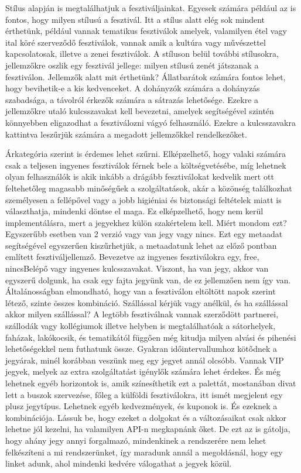 Stílus alapján is megtalálhatjuk a fesztiváljainkat. Egyesek számára például az is fontos, hogy milyen stílusú a fesztivál. Itt a stílus alatt elég sok mindent érthetünk, például vannak tematikus fesztiválok amelyek, valamilyen étel vagy ital köré szerveződő fesztiválok, vannak amik a kultúra vagy művészettel kapcsolatosak, illetve a zenei fesztiválok. A stíluson belül további stílusokra, jellemzőkre oszlik egy fesztivál jellege:  milyen stílusú zenét játszanak a fesztiválon. Jellemzők alatt mit érthetünk? Állatbarátok számára fontos lehet, hogy bevihetik-e  a kis kedvenceket. A dohányzók számára a dohányzás szabadsága, a távolról érkezők számára  a sátrazás lehetősége. Ezekre a jellemzőkre utaló kulcsszavakat kell bevezetni, amelyek segítségével szintén könnyebben eligazodhat a fesztiválozni vágyó felhasználó. Ezekre a kulcsszavakra kattintva leszűrjük számára a megadott jellemzőkkel rendelkezőket.

Árkategória szerint is érdemes lehet szűrni. Elképzelhető, hogy valaki számára csak a teljesen ingyenes fesztiválok férnek bele a költségvetésébe, míg lehetnek olyan felhasználók is akik inkább a drágább fesztiválokat kedvelik mert ott feltehetőleg magasabb minőségűek a szolgáltatások, akár a közönség találkozhat személyesen a fellépővel vagy a jobb higiéniai és biztonsági feltételek miatt is választhatja, mindenki döntse el maga. Ez elképzelhető, hogy nem kerül implementálásra, mert a jegyekhez külön szakértelem kell. Miért mondom ezt? Egyszerűbb esetben van 2 verzió vagy van jegy vagy nincs. Ezt egy metaadat segítségével egyszerűen kiszűrhetjük, a metaadatunk lehet az előző pontban említett fesztiváljellemző. Bevezetve az ingyenes fesztiválokra egy, free, nincsBelépő vagy ingyenes kulcsszavakat. Viszont, ha van jegy, akkor van egyszerű dolgunk, ha csak egy fajta jegyünk van, de ez jellemzően nem így van. Általánosságban elmondható, hogy van a fesztiválon eltöltött napok szerint létező, szinte összes kombináció. Szállással kérjük vagy anélkül, és ha szállással akkor milyen szállással? A legtöbb fesztiválnak vannak szerződött partnerei, szállodák vagy kollégiumok illetve helyben is megtalálhatóak a sátorhelyek, faházak, lakókocsik, és tematikától függően még kitudja milyen alvási és pihenési lehetőségekkel nem futhatunk össze. Gyakran időintervallumhoz kötődnek a jegyárak, minél korábban veszünk meg egy jegyet annál olcsóbb. Vannak VIP jegyek, melyek az extra szolgáltatást igénylők számára lehet érdekes. És még lehetnek egyéb horizontok is, amik színesíthetik ezt a palettát, mostanában divat lett a buszok szervezése, főleg a  külföldi fesztiválokra, itt ismét megjelent egy plusz jegytípus. Lehetnek egyéb kedvezmények, és kuponok is. És ezeknek a kombinációja. Lássuk be, hogy ezeket a dolgokat és a változásaikat csak akkor lehetne jól kezelni, ha valamilyen API-n megkapnánk őket. De ezt az is gátolja, hogy ahány jegy annyi forgalmazó, mindenkinek a rendszerére nem lehet felkészíteni a mi rendszerünket, így maradunk annál a megoldásnál, hogy egy linket adunk, ahol mindenki kedvére válogathat a jegyek közül.

